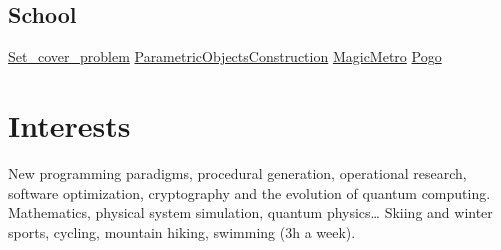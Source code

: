 \documentclass[letterpaper,10pt,sans]{moderncv}
\renewcommand{\deletedSpace}{-2mm}
\begin{document}
		\subsection{School}
				{\href{https://github.com/pinam45/UQAC_8INF870_Set_cover_problem}{Set\_cover\_problem}}
				{\href{https://github.com/pinam45/UTBM\_IN55\_ParametricObjectsConstruction}{ParametricObjectsConstruction}}
				{\href{https://github.com/TiWinDeTea/MagicMetro}{MagicMetro}}
				{\href{https://github.com/pinam45/UTBM_IA41_Pogo}{Pogo}}


	\vspace*{\deletedSpace}
	\section{Interests}
			{New programming paradigms, procedural generation, operational research, software optimization, cryptography and the evolution of quantum computing.}
			{Mathematics, physical system simulation, quantum physics\ldots}
			{Skiing and winter sports, cycling, mountain hiking, swimming (3h a week).}
\end{document}
